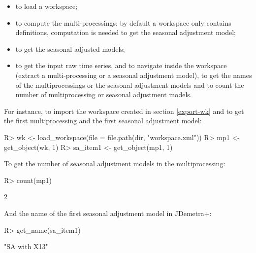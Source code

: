 \documentclass[article]{jss}
\providecommand{\tightlist}{%
  \setlength{\itemsep}{0pt}\setlength{\parskip}{0pt}}
\begin{document}
\begin{itemize}
\tightlist
\item
   to load a workspace;\\
\item
   to compute the multi-processings: by default a
  workspace only contains definitions, computation is needed to get the
  seasonal adjustment model;\\
\item
   to get the seasonal adjusted models;\\
\item
   to get the input raw time series, 
  and  to navigate inside the workspace (extract a
  multi-processing or a seasonal adjustment model),  to
  get the names of the multiprocessings or the seasonal adjustment
  models and  to count the number of multiprocessing or
  seasonal adjustment models.
\end{itemize}

For instance, to import the workspace created in section \ref{export-wk}
and to get the first multiprocessing and the first seasonal adjustment
model:

\begin{CodeChunk}

\begin{CodeInput}
R> wk <- load_workspace(file =  file.path(dir, "workspace.xml"))
R> mp1 <- get_object(wk, 1)
R> sa_item1 <- get_object(mp1, 1)
\end{CodeInput}
\end{CodeChunk}

To get the number of seasonal adjustment models in the multiprocessing:

\begin{CodeChunk}

\begin{CodeInput}
R> count(mp1)
\end{CodeInput}

\begin{CodeOutput}
[1] 2
\end{CodeOutput}
\end{CodeChunk}

And the name of the first seasonal adjustment model in JDemetra+:

\begin{CodeChunk}

\begin{CodeInput}
R> get_name(sa_item1) 
\end{CodeInput}

\begin{CodeOutput}
[1] "SA with X13"
\end{CodeOutput}
\end{CodeChunk}
\end{document}
